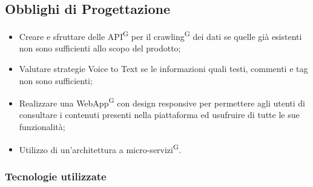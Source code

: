 


\subsection{Obblighi di Progettazione}


\begin{itemize}
  \item Creare e sfruttare delle API\textsuperscript{G} per il crawling\textsuperscript{G} dei dati se quelle già esistenti non sono sufficienti allo scopo del prodotto;
  \item Valutare strategie Voice to Text se le informazioni quali testi, commenti e tag non sono sufficienti;
  \item Realizzare una WebApp\textsuperscript{G} con design responsive per permettere agli utenti di consultare i contenuti presenti nella piattaforma ed usufruire di tutte le sue funzionalità;
  \item Utilizzo di un'architettura a micro-servizi\textsuperscript{G}.
\end{itemize}

\subsubsection{Tecnologie utilizzate}

